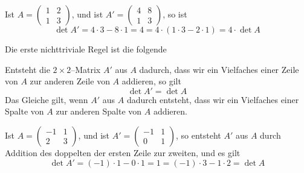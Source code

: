 \begin{beispiel} Ist $A = \left( \begin{smallmatrix} 1 & 2 \\ 1 & 3 \end{smallmatrix} \right)$, und ist
$A' = \left( \begin{smallmatrix} 4 & 8 \\ 1 & 3 \end{smallmatrix} \right)$, so ist
  	$$ \det{A'} = 4 \cdot 3 - 8 \cdot 1 = 4 = 4 \cdot \left( 1 \cdot 3 - 2 \cdot 1 \right) = 
  	4 \cdot \det{A} $$
\end{beispiel}

\medbreak

Die erste nichttriviale Regel ist die folgende

\begin{regel}\label{det_rule_2_5} Entsteht die $2 \times 2$--Matrix $A'$ aus $A$ dadurch, dass wir ein 
Vielfaches einer Zeile von 
$A$ zur anderen Zeile von $A$ addieren, so gilt
  	$$ \det{A'} =  \det{A} $$
Das Gleiche gilt, wenn $A'$ aus $A$ dadurch entsteht, dass wir ein Vielfaches einer Spalte von 
$A$ zur anderen Spalte von $A$ addieren.
\end{regel}


\begin{beispiel} Ist $A = \left( \begin{smallmatrix} -1 & 1 \\ 2 & 3 \end{smallmatrix} \right)$, und ist
$A' = \left( \begin{smallmatrix} -1 & 1 \\ 0 & 1 \end{smallmatrix} \right)$, so entsteht $A'$ aus $A$ durch 
Addition des doppelten der ersten Zeile zur zweiten, und es gilt
  	$$ \det{A'} = (-1) \cdot 1 - 0 \cdot 1 = 1 = (-1) \cdot 3 - 1 \cdot 2 = \det{A} $$
\end{beispiel}


